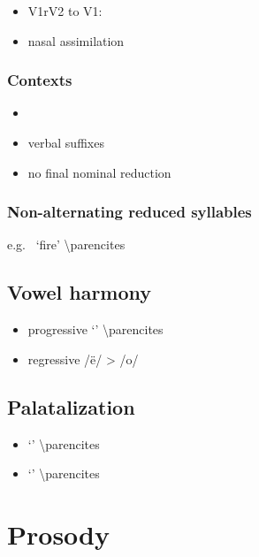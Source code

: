 \documentclass{memoir}
\begin{document}
\begin{itemize}
\tightlist
\item
  V1rV2 to V1:
\item
  nasal assimilation
\end{itemize}

\subsubsection{Contexts}

\begin{itemize}
\item
\item
  verbal suffixes
\item
  no final nominal reduction
\end{itemize}

\subsubsection{Non-alternating reduced syllables}

e.g.~ `fire' \textbackslash parencites

\subsection{\texorpdfstring{Vowel harmony
\label{sec:vowelharm}}{Vowel harmony }}

\begin{itemize}
\tightlist
\item
  progressive  `' \textbackslash parencites
\item
  regressive /ë/ \textgreater{} /o/
\end{itemize}

\subsection{\texorpdfstring{Palatalization
\label{sec:palatalization}}{Palatalization }}

\begin{itemize}
\tightlist
\item
   `' \textbackslash parencites
\item
   `' \textbackslash parencites
\end{itemize}

\section{\texorpdfstring{Prosody \label{sec:prosody}}{Prosody }}
\end{document}
